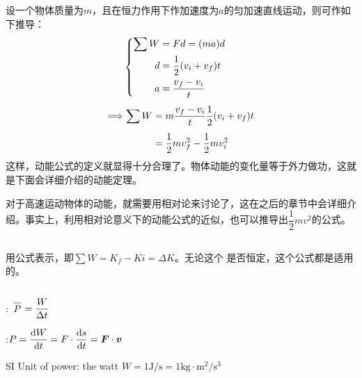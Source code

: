 设一个物体质量为$m$，且在恒力作用下作加速度为$a$的匀加速直线运动，则可作如下推导：
\begin{equation}
    \begin{aligned}
    	&\hspace*{-3em}\left\{\begin{aligned}
    		\sum W&=Fd=(ma)d\\
    		d&=\frac{1}{2}(v_{i}+v_{f})t\\
    		a&=\frac{v_{f}-v_{i}}{t}
    	\end{aligned}\right.\\[1ex]
  \Longrightarrow \sum W&=m\frac{v_{f}-v_{i}}{t}\frac{1}{2}(v_{i}+v_{f})t\\[1ex]
  &=\frac{1}{2}mv_{f}^{2}-\frac{1}{2}mv_{i}^{2}
    \end{aligned}
    \nonumber
\end{equation}
这样，动能公式的定义就显得十分合理了。物体动能的变化量等于外力做功，这就是下面会详细介绍的动能定理。

对于高速运动物体的动能，就需要用相对论来讨论了，这在之后的章节中会详细介绍。事实上，利用相对论意义下的动能公式的近似，也可以推导出$\dfrac{1}{2}mv^{2}$的公式。
\subsection[动能定理]{}
\begin{law}
\end{law}
用公式表示，即$\sum W =K_{f}-K{i}=\Delta K$。无论这个  是否恒定，这个公式都是适用的。
\subsection[功率]{}
\begin{Itemize}
  \item {}
  \item {}: $\upperline{P} =\dfrac{W}{\Delta t}$
  \item {}:$P=\dfrac{\dif W}{\dif t}=F\cdot\dfrac{\dif s}{\dif t}=\vec{F}\cdot\vec{v}$
  \item SI Unit of power: the watt $W=1\mathrm{J}/\mathrm{s}=1\mathrm{kg}\cdot \mathrm{m}^2/\mathrm{s}^3$
\end{Itemize}

